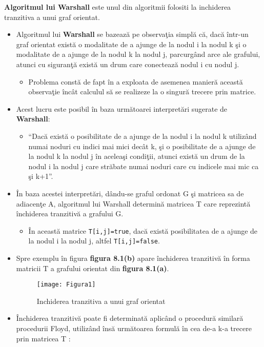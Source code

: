 \documentclass{report}
\begin{document}
\begin{flushleft}
\textbf {Algoritmul lui Warshall} este unul din algoritmii folositi la inchiderea tranzitiva a unui graf orientat.
\begin{itemize}
\item
Algoritmul lui \textbf {Warshall} se bazează pe observaţia simplă că, dacă într-un graf orientat
există o modalitate de a ajunge de la nodul i la nodul k şi o modalitate de a ajunge de
la nodul k la nodul j, parcurgând arce ale grafului, atunci cu siguranţă există un drum
care conectează nodul i cu nodul j. 
\begin{itemize}
\item
Problema constă de fapt în a exploata de asemenea manieră această observaţie
încât calculul să se realizeze la o singură trecere prin matrice. 
\end{itemize}
\item
Acest lucru este posibil în baza următoarei interpretări sugerate de \textbf {Warshall}:
\begin{itemize}
\item
 “Dacă există o posibilitate de a ajunge de la nodul i la nodul k utilizând
numai noduri cu indici mai mici decât k, şi o posibilitate de a ajunge de la
nodul k la nodul j în aceleaşi condiţii, atunci există un drum de la nodul i la
nodul j care străbate numai noduri care cu indicele mai mic ca şi k+1”. 
\end{itemize}
\item
În baza acestei interpretări, dându-se graful ordonat G şi matricea sa de adiacenţe A,
algoritmul lui Warshall determină matricea T care reprezintă închiderea tranzitivă a
grafului G.
\begin{itemize}
\item
În această matrice \texttt{T[i,j]=true}, dacă există posibilitatea de a ajunge de la
nodul i la nodul j, altfel \texttt{T[i,j]=false}. 
\end{itemize}
\item
Spre exemplu în figura \textbf {figura 8.1(b) } apare închiderea tranzitivă în forma matricii T a
grafului orientat din \textbf{figura  8.1(a)}. 
\begin{figure}[htb]
\begin{center}
\texttt{[image: Figura1]}
\end{center}
\caption {Inchiderea tranzitiva a unui graf orientat}
\end{figure}
\item
Închiderea tranzitivă poate fi determinată aplicând o procedură similară procedurii
Floyd, utilizând însă următoarea formulă în cea de-a k-a trecere prin matricea T :
\newline


\end{itemize}
\end{flushleft}
\end{document}
